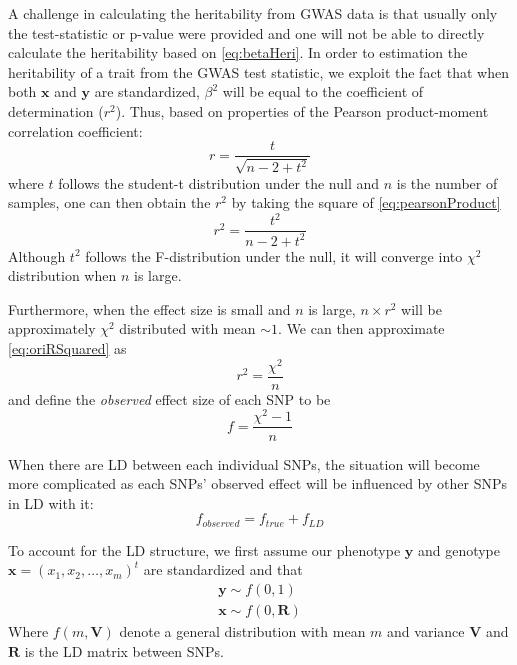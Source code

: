 			A challenge in calculating the heritability from \gls{GWAS} data is that usually only the test-statistic or p-value were provided and one will not be able to directly calculate the heritability based on \cref{eq:betaHeri}. 
			In order to estimation the heritability of a trait from the \gls{GWAS} test statistic, we exploit the fact that when both $\boldsymbol{x}$ and $\boldsymbol{y}$ are standardized, $\beta^2$ will be equal to the coefficient of determination ($r^2$). 
			Thus, based on properties of the Pearson product-moment correlation coefficient:
			\begin{equation}
				r = \frac{t}{\sqrt{n-2+t^2}}
				\label{eq:pearsonProduct}
			\end{equation}
			where $t$ follows the student-t distribution under the null and $n$ is the number of samples, one can then obtain the $r^2$ by taking the square of \cref{eq:pearsonProduct}
			\begin{equation}
				r^2 = \frac{t^2}{n-2+t^2}
				\label{eq:oriRSquared}
			\end{equation}
			Although $t^2$ follows the F-distribution under the null, it will converge into $\chi^2$ distribution when $n$ is large.
			
			Furthermore, when the effect size is small and $n$ is large, $n\times r^2$ will be approximately $\chi^2$ distributed with mean $\sim 1$. 
			We can then approximate \cref{eq:oriRSquared} as
			\begin{equation}
				r^2= \frac{\chi^2}{n}
				\label{eq:approxChi}
			\end{equation}
			and define the \emph{observed} effect size of each \gls{SNP} to be
			\begin{equation}
			f=\frac{\chi^2-1}{n}
			\label{eq:observedEffect}
			\end{equation}
			
			When there are \gls{LD} between each individual \glspl{SNP}, the situation will become more complicated as each \glspl{SNP}' observed effect will be influenced by other \glspl{SNP} in \gls{LD} with it:
			\begin{equation}
			f_{observed} = f_{true}+f_{LD}
			\label{eq:conceptF}
			\end{equation}
			
			To account for the \gls{LD} structure, we first assume our phenotype $\boldsymbol{y}$ and genotype $\boldsymbol{x}=(x_1,x_2,\dots,x_m)^t$ are standardized and that
			\begin{align*}
				\boldsymbol{y}\sim f(0,1) \\
				\boldsymbol{x}\sim f(0,\boldsymbol{R})
			\end{align*}
			Where $f(m, \boldsymbol{V})$ denote a general distribution with mean $m$ and variance $\boldsymbol{V}$ and $\boldsymbol{R}$ is the \gls{LD} matrix between \glspl{SNP}.
			
